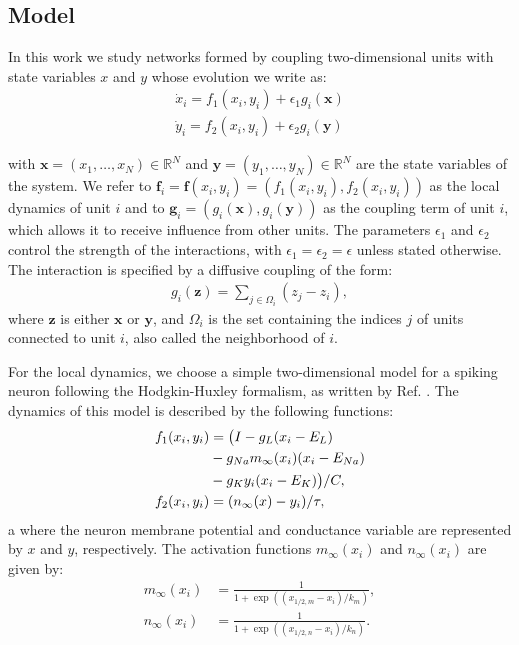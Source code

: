 \subsection{Model}\label{sec:uncoupled}
In this work we study networks formed by coupling two-dimensional units with state variables $x$ and $y$ whose evolution we write as:
%
\begin{align}\label{eq:generic-network-equation}
    \dot{x}_i = f_1(x_i, y_i) + \epsilon_1 g_i(\mathbf{x})\\
    \dot{y}_i = f_2(x_i, y_i) + \epsilon_2 g_i(\mathbf{y})
\end{align}

with $\mathbf{x} = (x_1, \ldots, x_N) \in \mathbb{R}^N$ and $\mathbf{y} = (y_1, \ldots, y_N) \in \mathbb{R}^N$ are the state variables of the system. We refer to $\mathbf{f}_i = \mathbf{f}(x_i, y_i) = (f_1(x_i, y_i), f_2(x_i, y_i))$ as the local dynamics of unit $i$ and to $\mathbf{g}_i  = (g_i(\mathbf{x}), g_i(\mathbf{y}))$ as the coupling term of unit $i$, which allows it to receive influence from other units. The parameters $\epsilon_1$ and $\epsilon_2$ control the strength of the interactions, with $\epsilon_1 = \epsilon_2 = \epsilon$ unless stated otherwise. The interaction is specified by a diffusive coupling of the form:
%
\begin{align}
  g_i(\mathbf{z}) = \sum_{j \in \Omega_i} (z_j - z_i),  
\end{align}
where $\mathbf{z}$ is either $\mathbf{x}$ or $\mathbf{y}$, and $\Omega_i$ is the set containing the indices $j$ of units connected to unit $i$, also called the neighborhood of $i$. 

For the local dynamics, we choose a simple two-dimensional model for a spiking neuron following the Hodgkin-Huxley formalism, as written by Ref. \cite{izhikevichbook}. The dynamics of this model is described by the following functions:
\begin{align}
\label{eq1:neuron-model}
    f_1(x_i, y_i) &= \big(I - g_L (x_i - E_L)  \\ 
    &- g_{Na} m_\infty(x_i) (x_i - E_{Na}) \notag \\
    &-g_K y_i (x_i - E_K) \big)/C, \notag\\
\label{eq2:neuron-model}
    f_2(x_i, y_i) &= (n_\infty(x) - y_i) / \tau,
\end{align}a
where the neuron membrane potential and conductance variable are represented by $x$ and $y$, respectively. The activation functions $m_\infty(x_i)$ and $n_\infty(x_i)$ are given by:
%
\begin{align}
 m_\infty(x_i) &= \frac{1}{1 + \exp ((x_{1/2, m} - x_i)/k_m) }, \\
 n_\infty(x_i) &= \frac{1}{1 + \exp ((x_{1/2, n} -x_i)/k_n) }.
\end{align}

